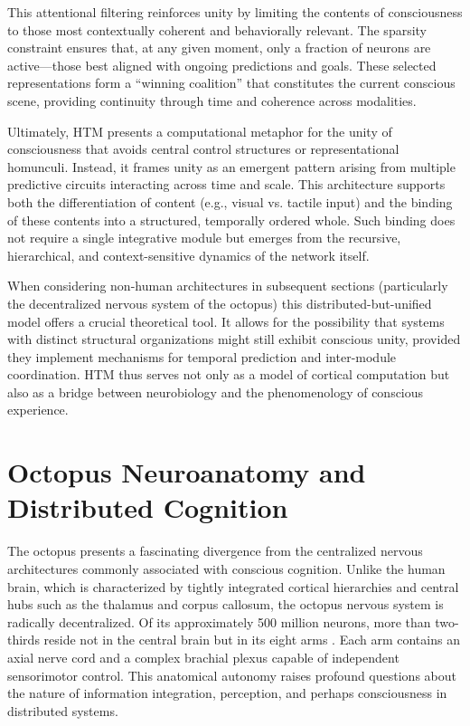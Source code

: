 \documentclass{article}
\begin{document}
This attentional filtering reinforces unity by limiting the contents of consciousness to those most contextually coherent and behaviorally relevant. The sparsity constraint ensures that, at any given moment, only a fraction of neurons are active—those best aligned with ongoing predictions and goals. These selected representations form a “winning coalition” that constitutes the current conscious scene, providing continuity through time and coherence across modalities.

Ultimately, HTM presents a computational metaphor for the unity of consciousness that avoids central control structures or representational homunculi. Instead, it frames unity as an emergent pattern arising from multiple predictive circuits interacting across time and scale. This architecture supports both the differentiation of content (e.g., visual vs. tactile input) and the binding of these contents into a structured, temporally ordered whole. Such binding does not require a single integrative module but emerges from the recursive, hierarchical, and context-sensitive dynamics of the network itself.

When considering non-human architectures in subsequent sections (particularly the decentralized nervous system of the octopus) this distributed-but-unified model offers a crucial theoretical tool. It allows for the possibility that systems with distinct structural organizations might still exhibit conscious unity, provided they implement mechanisms for temporal prediction and inter-module coordination. HTM thus serves not only as a model of cortical computation but also as a bridge between neurobiology and the phenomenology of conscious experience.

\section{Octopus Neuroanatomy and Distributed Cognition}

The octopus presents a fascinating divergence from the centralized nervous architectures commonly associated with conscious cognition. Unlike the human brain, which is characterized by tightly integrated cortical hierarchies and central hubs such as the thalamus and corpus callosum, the octopus nervous system is radically decentralized. Of its approximately 500 million neurons, more than two-thirds reside not in the central brain but in its eight arms \parencite{huffard2013cephalopod}. Each arm contains an axial nerve cord and a complex brachial plexus capable of independent sensorimotor control. This anatomical autonomy raises profound questions about the nature of information integration, perception, and perhaps consciousness in distributed systems.
\end{document}
